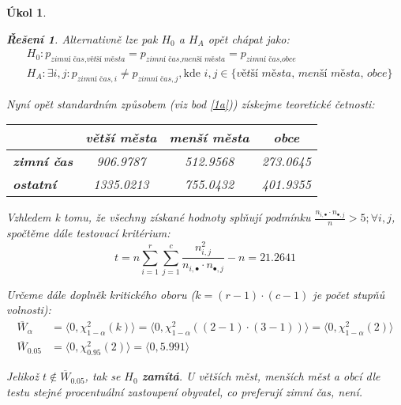 \documentclass[11pt, a4paper]{article}
\theoremstyle{result}
\newtheorem*{result}{Řešení}
\newtheorem{task}{Úkol}
\begin{document}
\begin{task}
\begin{enumerate}[a)]
\begin{result}
            Alternativně lze pak $H_0$ a $H_A$ opět chápat jako:
            \begin{align*}
                &H_0: p_{\textit{zimní čas}, \textit{větší města}} = p_{\textit{zimní čas}, \textit{menší města}} = p_{\textit{zimní čas}, \textit{obce}} \\
                &H_A: \exists i, j: p_{\textit{zimní čas}, i} \neq p_{\textit{zimní čas}, j}, \text{kde } i,j \in \{\textit{větší města, menší města, obce}\}
            \end{align*}

            Nyní opět standardním způsobem (viz bod \ref{1a})) získejme teoretické četnosti:

            \begin{center}
                \begin{tabular}{ |l|c|c|c| }
                    \hline
                    & \textbf{větší města} & \textbf{menší města} & \textbf{obce} \\
                    \hline
                    \textbf{zimní čas} & 906.9787 & 512.9568 & 273.0645 \\
                    \hline
                    \textbf{ostatní} & 1335.0213 & 755.0432 & 401.9355 \\
                    \hline
                \end{tabular}
            \end{center}

            Vzhledem k tomu, že všechny získané hodnoty splňují podmínku $\frac{n_{i, \bullet} \cdot n_{\bullet, j}}{n} > 5; \forall i,j$, spočtěme dále testovací kritérium:
            $$t = n \sum_{i=1}^{r} \sum_{j=1}^{c} \frac{n_{i, j}^2}{n_{i, \bullet} \cdot n_{\bullet, j}} - n = 21.2641$$

            Určeme dále doplněk kritického oboru ($k = (r - 1)\cdot(c - 1)$ je počet stupňů volnosti):
            \begin{align*}
                \overline{W}_\alpha &= \langle 0, \chi_{1 - \alpha}^2(k) \rangle = \langle 0, \chi_{1 - \alpha}^2((2 - 1)\cdot(3 - 1)) \rangle = \langle 0, \chi_{1 - \alpha}^2(2) \rangle \\
                \overline{W}_{0.05} &= \langle 0, \chi_{0.95}^2(2) \rangle = \langle 0, 5.991 \rangle
            \end{align*}

            Jelikož $t \notin \overline{W}_{0.05}$, tak se $H_0$ \textbf{zamítá}. U větších měst, menších měst a obcí dle testu stejné procentuální zastoupení obyvatel, co preferují zimní čas, není.
            

\end{result}
\end{enumerate}
\end{task}
\end{document}
